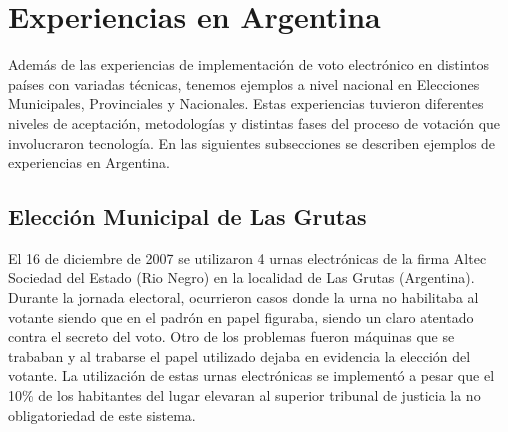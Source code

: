 \section{Experiencias en Argentina}
Además de las experiencias de implementación de voto electrónico en distintos países con variadas técnicas, tenemos ejemplos a nivel nacional en Elecciones Municipales, Provinciales y Nacionales. Estas experiencias tuvieron diferentes niveles de aceptación, metodologías y distintas fases del proceso de votación que involucraron tecnología. En las siguientes subsecciones se describen ejemplos de experiencias en Argentina.

\subsection{Elección Municipal de Las Grutas}
El 16 de diciembre de 2007 se utilizaron 4 urnas electrónicas de la firma Altec Sociedad del Estado (Rio Negro) en la localidad de Las Grutas (Argentina). Durante la jornada electoral, ocurrieron casos donde la urna no habilitaba al votante siendo que en el padrón en papel figuraba, siendo un claro atentado contra el secreto del voto. Otro de los problemas fueron máquinas que se trababan y al trabarse el papel utilizado dejaba en evidencia la elección del votante. La utilización de estas urnas electrónicas se implementó a pesar que el 10\% de los habitantes del lugar elevaran al superior tribunal de justicia la no obligatoriedad de este sistema. \cite{eleccionesLasGrutas}
